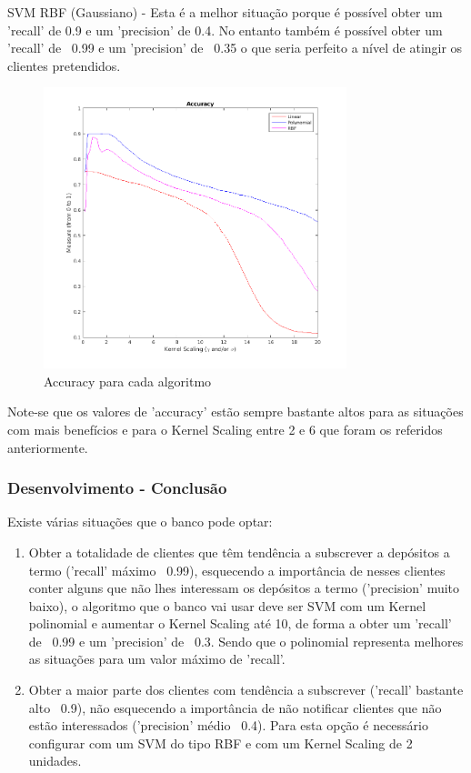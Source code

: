 \documentclass[portugues,final]{revdetua}
\begin{document}
SVM RBF (Gaussiano) - Esta é a melhor situação porque é possível obter um 'recall' de 0.9 e um 'precision' de 0.4. No entanto também é possível obter um 'recall' de ~0.99 e um 'precision' de ~0.35 o que seria perfeito a nível de atingir os clientes pretendidos.\\

\begin{figure}[H]
\centerline{\includegraphics[width=250pt]{images/svm_accuracy.png}}
\caption{Accuracy para cada algoritmo}
\label{img:complete}
\end{figure}

Note-se que os valores de 'accuracy' estão sempre bastante altos para as situações com mais benefícios e para o Kernel Scaling entre 2 e 6 que foram os referidos anteriormente.

\subsubsection{Desenvolvimento - Conclusão}

Existe várias situações que o banco pode optar:
\begin{enumerate}
\item Obter a totalidade de clientes que têm tendência a subscrever a depósitos a termo ('recall' máximo ~0.99), esquecendo a importância de nesses clientes conter alguns que não lhes interessam os depósitos a termo ('precision' muito baixo), o algoritmo que o banco vai usar deve ser SVM com um Kernel polinomial e aumentar o Kernel Scaling até 10, de forma a obter um 'recall' de ~0.99 e um 'precision' de ~0.3. Sendo que o polinomial representa melhores as situações para um valor máximo de 'recall'.
\item Obter a maior parte dos clientes com tendência a subscrever ('recall' bastante alto ~0.9), não esquecendo a importância de não notificar clientes que não estão interessados ('precision' médio ~0.4). Para esta opção é necessário configurar com um SVM do tipo RBF e com um Kernel Scaling de 2 unidades.
\end{enumerate}
\end{document}

